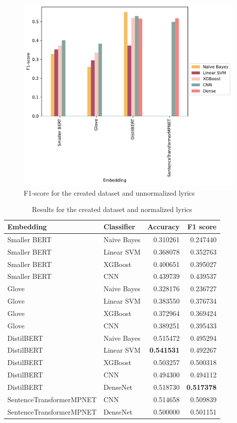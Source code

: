 \begin{figure}
\centering
\includegraphics[width=0.8\linewidth]{plots/f1_dataset.pdf}
\caption{F1-score for the created dataset and unnormalized lyrics}
\label{fig:f1_dataset}
\end{figure}

\begin{table}[h]
\centering
\begin{tabular}{l|l|r|r}
\textbf{Embedding} & \textbf{Classifier} & \textbf{Accuracy} & \textbf{F1 score} \\\hline
Smaller BERT & Naive Bayes & 0.310261 & 0.247440 \\
Smaller BERT & Linear SVM & 0.368078 & 0.352763 \\
Smaller BERT & XGBoost & 0.400651 & 0.395027 \\
Smaller BERT & CNN & 0.439739 & 0.439537 \\
Glove & Naive Bayes & 0.328176 & 0.236727 \\
Glove & Linear SVM & 0.383550 & 0.376734 \\
Glove & XGBoost & 0.372964 & 0.369424 \\
Glove & CNN & 0.389251 & 0.395433 \\
DistilBERT & Naive Bayes & 0.515472 & 0.495294 \\
DistilBERT & Linear SVM & \textbf{0.541531} & 0.492267 \\
DistilBERT & XGBoost & 0.503257 & 0.500318 \\
DistilBERT & CNN & 0.494300 & 0.494112 \\
DistilBERT & DenseNet & 0.518730 & \textbf{0.517378} \\
SentenceTransformerMPNET & CNN & 0.514658 & 0.509839 \\
SentenceTransformerMPNET & DenseNet & 0.500000 & 0.501151 \\
\end{tabular}
\caption{Results for the created dataset and normalized lyrics}
\label{tab:dataset_res_norm}
\end{table}

